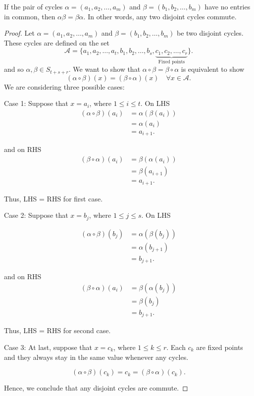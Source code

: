 \begin{theorem}
    If the pair of cycles $\alpha = (a_1, a_2, \ldots, a_m)$ and $\beta = (b_1, b_2, \ldots, b_m)$ have no 
    entries in common, then $\alpha \beta = \beta \alpha$. In other words, any two disjoint cycles commute.
\end{theorem}
\begin{proof}
    Let $\alpha = (a_1, a_2, \ldots, a_m)$ and $\beta = (b_1, b_2, \ldots, b_m)$ be two disjoint cycles. These cycles 
    are defined on the set 
    \[
        \mathcal{A} = \{ a_1, a_2, \ldots, a_t, b_1, b_2, \ldots, b_s, \underbrace{c_1, c_2, \ldots, c_r}_{\text{Fixed points}} \}.
    \]
    and so $\alpha, \beta \in S_{t+s+r}$. We want to show that $\alpha \circ \beta = \beta \circ \alpha$ is equivalent 
    to show 
    \[
        (\alpha \circ \beta)(x) = (\beta \circ \alpha)(x) \quad \forall x \in \mathcal{A}.
    \]
    We are considering three possible cases:

    Case 1: Suppose that $x = a_i$, where $1 \leq i \leq t$. On LHS
    \begin{align*}
        (\alpha \circ \beta)(a_i) &= \alpha( \beta(a_i))\\
        &= \alpha(a_i)\\
        &= a_{i+1}.
    \end{align*}

    and on RHS
    \begin{align*}
        (\beta \circ \alpha)(a_i) &= \beta( \alpha(a_i))\\
        &= \beta(a_{i+1})\\
        &= a_{i+1}.
    \end{align*}

    Thus, LHS = RHS for first case.

    Case 2: Suppose that $x = b_j$, where $1 \leq j \leq s$. On LHS

    \begin{align*}
        (\alpha \circ \beta)(b_j) &= \alpha( \beta(b_j))\\
        &= \alpha(b_{j+1})\\
        &= b_{j+1}.
    \end{align*}

    and on RHS
    \begin{align*}
        (\beta \circ \alpha)(a_i) &= \beta( \alpha(b_j))\\
        &= \beta(b_{j})\\
        &= b_{j+1}.
    \end{align*}

    
    Thus, LHS = RHS for second case.

    Case 3: At last, suppose that $x = c_k$, where $1 \leq k \leq r$. Each $c_k$ are fixed points and 
    they always stay in the same value whenever any cycles.

    \[
        (\alpha \circ \beta)(c_k) = c_k = (\beta \circ \alpha)(c_k).
    \]

    Hence, we conclude that any disjoint cycles are commute.
\end{proof}

